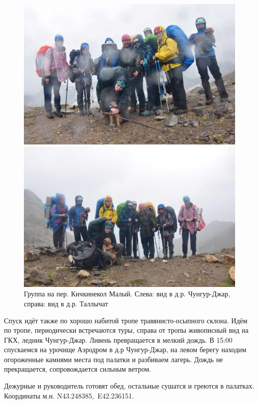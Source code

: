 \begin{figure}[h!]
	\centering
	\begin{minipage}[h]{0.48\linewidth}
		\includegraphics[width=0.99\linewidth]{../pics/DSC_0239.jpg}
	\end{minipage}
	\quad
	\begin{minipage}[h]{0.48\linewidth}
		\includegraphics[width=0.99\linewidth]{../pics/DSC_0242.jpg}
	\end{minipage}
	\caption{Группа на пер. Кичкинекол Малый. Слева: вид в д.р. Чунгур-Джар, справа: вид в д.р. Таллычат}
	\label{fig:DSC_0239}
\end{figure}

Спуск идёт также по хорошо набитой тропе травянисто-осыпного склона. Идём по тропе, периодически встречаются туры, справа от тропы живописный вид на ГКХ, ледник Чунгур-Джар. Ливень превращается в мелкий дождь. В 15:00 спускаемся на урочище Аэродром в д.р Чунгур-Джар, на левом берегу находим огороженные камнями места под палатки и разбиваем лагерь. Дождь не прекращается, сопровождается сильным ветром.

Дежурные и руководитель готовят обед, остальные сушатся и греются в палатках. Координаты м.н. N43.248385\degree,~E42.236151\degree.


\clearpage